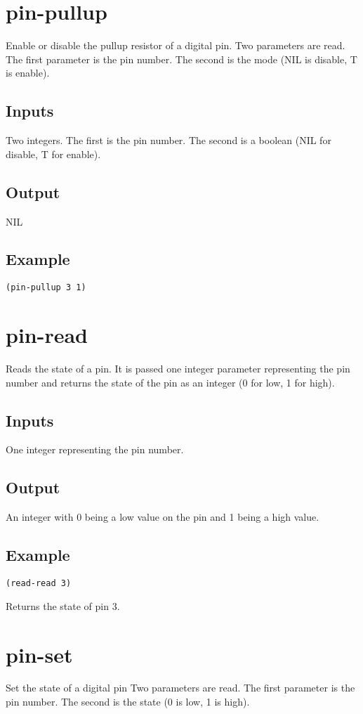 \documentclass[10pt, openany]{book}
\begin{document}
\section{pin-pullup}
Enable or disable the pullup resistor of a digital pin.  Two parameters are read.  The first parameter is the pin number.  The  second is the mode (NIL is disable, T is enable).
\subsection{Inputs}
Two integers.  The first is the pin number.  The second is a boolean (NIL for disable, T for enable).
\subsection{Output}
NIL
\subsection{Example}
\begin{lstlisting}
(pin-pullup 3 1)
\end{lstlisting}

\section{pin-read}
Reads the state of a pin.  It is passed one integer parameter representing the pin number and returns the state of the pin as an integer (0 for low, 1 for high).
\subsection{Inputs}
One integer representing the pin number.
\subsection{Output}
An integer with 0 being a low value on the pin and 1 being a high value.
\subsection{Example}
\begin{lstlisting}
(read-read 3)
\end{lstlisting}
Returns the state of pin 3.

\section{pin-set}
Set the state of a digital pin  Two parameters are read.  The first parameter is the pin number.  The second is the state (0 is low, 1 is high).
\end{document}
